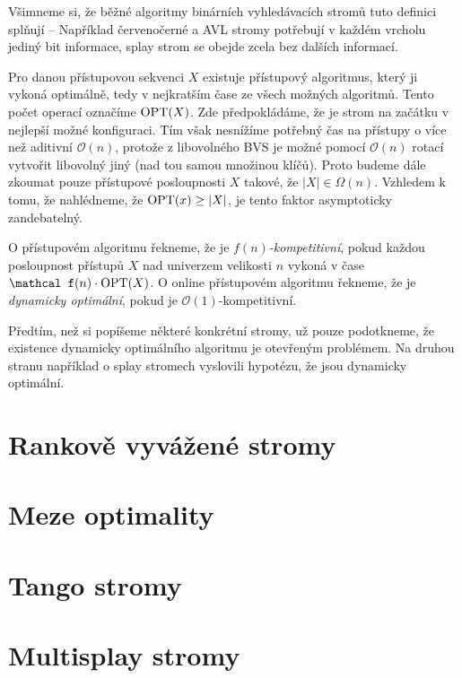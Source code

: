 Všimneme si, že běžné algoritmy binárních vyhledávacích stromů tuto definici
splňují -- Například červenočerné a AVL stromy potřebují v každém vrcholu
jediný bit informace, splay strom se obejde zcela bez dalších informací.

Pro danou přístupovou sekvenci $X$ existuje přístupový algoritmus, který ji
vykoná optimálně, tedy v nejkratším čase ze všech možných algoritmů. Tento
počet operací označíme $\operatorname{OPT}(X)$. Zde předpokládáme, že je strom na začátku v
nejlepší možné konfiguraci. Tím však nesnížíme potřebný čas na přístupy o více
než aditivní $\mathcal O(n)$, protože z libovolného BVS je možné pomocí
$\mathcal O(n)$ rotací vytvořit libovolný jiný (nad tou samou množinou klíčů).
Proto budeme dále zkoumat pouze přístupové posloupnosti $X$ takové, že $|X| \in
\Omega(n)$. Vzhledem k tomu, že nahlédneme, že $\operatorname{OPT}(x)\geq |X|$, je tento
faktor asymptoticky zandebatelný. 


\begin{definice}
O přístupovém algoritmu řekneme, že je \emph{$f(n)$-kompetitivní}, pokud každou
posloupnost přístupů $X$ nad univerzem velikosti $n$ vykoná v čase $\mathcal
f(n)\cdot\opt(X)$. O online přístupovém algoritmu řekneme, že je
\emph{dynamicky optimální}, pokud je $\mathcal O(1)$-kompetitivní.
\end{definice}

Předtím, než si popíšeme některé konkrétní stromy, už pouze podotkneme, že
existence dynamicky optimálního algoritmu je otevřeným problémem. Na druhou
stranu například o splay stromech vyslovili \citet{splay} hypotézu, že jsou
dynamicky optimální.

\section{Rankově vyvážené stromy}

\section{Meze optimality}

\section{Tango stromy}

\section{Multisplay stromy}

